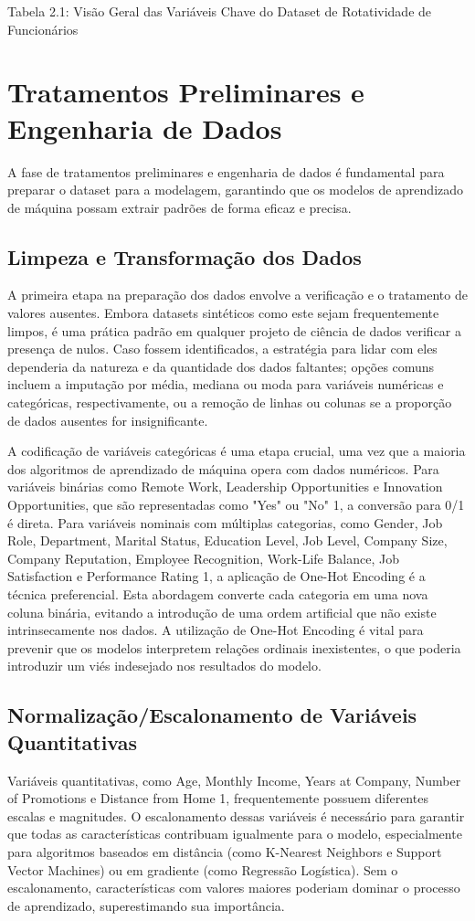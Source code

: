 \documentclass[sigconf]{acmart}
\begin{document}
Tabela 2.1: Visão Geral das Variáveis Chave do Dataset de Rotatividade de Funcionários

\section{Tratamentos Preliminares e Engenharia de Dados}
A fase de tratamentos preliminares e engenharia de dados é fundamental para preparar o dataset para a modelagem, garantindo que os modelos de aprendizado de máquina possam extrair padrões de forma eficaz e precisa.

\subsection{Limpeza e Transformação dos Dados}
A primeira etapa na preparação dos dados envolve a verificação e o tratamento de valores ausentes. Embora datasets sintéticos como este sejam frequentemente limpos, é uma prática padrão em qualquer projeto de ciência de dados verificar a presença de nulos. Caso fossem identificados, a estratégia para lidar com eles dependeria da natureza e da quantidade dos dados faltantes; opções comuns incluem a imputação por média, mediana ou moda para variáveis numéricas e categóricas, respectivamente, ou a remoção de linhas ou colunas se a proporção de dados ausentes for insignificante.

A codificação de variáveis categóricas é uma etapa crucial, uma vez que a maioria dos algoritmos de aprendizado de máquina opera com dados numéricos. Para variáveis binárias como Remote Work, Leadership Opportunities e Innovation Opportunities, que são representadas como "Yes" ou "No" 1, a conversão para 0/1 é direta. Para variáveis nominais com múltiplas categorias, como Gender, Job Role, Department, Marital Status, Education Level, Job Level, Company Size, Company Reputation, Employee Recognition, Work-Life Balance, Job Satisfaction e Performance Rating 1, a aplicação de One-Hot Encoding é a técnica preferencial. Esta abordagem converte cada categoria em uma nova coluna binária, evitando a introdução de uma ordem artificial que não existe intrinsecamente nos dados. A utilização de One-Hot Encoding é vital para prevenir que os modelos interpretem relações ordinais inexistentes, o que poderia introduzir um viés indesejado nos resultados do modelo.

\subsection{Normalização/Escalonamento de Variáveis Quantitativas}
Variáveis quantitativas, como Age, Monthly Income, Years at Company, Number of Promotions e Distance from Home 1, frequentemente possuem diferentes escalas e magnitudes. O escalonamento dessas variáveis é necessário para garantir que todas as características contribuam igualmente para o modelo, especialmente para algoritmos baseados em distância (como K-Nearest Neighbors e Support Vector Machines) ou em gradiente (como Regressão Logística). Sem o escalonamento, características com valores maiores poderiam dominar o processo de aprendizado, superestimando sua importância.
\end{document}
